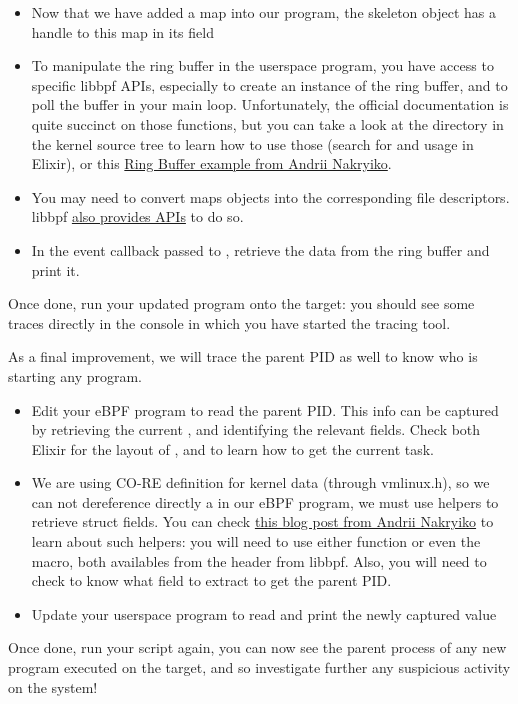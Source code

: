 \begin{itemize}
  \begin{itemize}
    \item Now that we have added a map into our program, the skeleton object has a handle to this map in its  field
    \item To manipulate the ring buffer in the userspace program, you have
    access to specific libbpf APIs, especially  to
    create an instance of the ring buffer, and  to poll
    the buffer in your main loop. Unfortunately, the official documentation is
    quite succinct on those functions, but you can take a look at the
     directory in the kernel source tree to learn how to
    use those (search for  and
     usage in Elixir), or this
    \href{https://github.com/anakryiko/bpf-ringbuf-examples/blob/main/src/ringbuf-output.c}{Ring
    Buffer example from Andrii Nakryiko}.
    \item You may need to convert maps objects into the corresponding file descriptors. libbpf \href{https://libbpf.readthedocs.io/en/latest/api.html}{also provides APIs} to do so.
    \item In the event callback passed to , retrieve the data from the ring buffer and print it.
  \end{itemize}
\end{itemize}

Once done, run your updated program onto the target: you should see some traces directly in the console in which you have started the tracing tool.

As a final improvement, we will trace the parent PID as well to know who is starting any program.
\begin{itemize}
  \item Edit your eBPF program to read the parent PID. This info can be captured by retrieving the current , and identifying the relevant fields. Check both Elixir for the layout of , and  to learn how to get the current task.
  \item We are using CO-RE definition for kernel data (through vmlinux.h), so
  we can not dereference directly a  in our eBPF
  program, we must use helpers to retrieve struct fields. You can check
  \href{https://nakryiko.com/posts/bpf-core-reference-guide/#the-missing-manual}{this
  blog post from Andrii Nakryiko} to learn about such helpers: you will need to
  use either  function or even the 
  macro, both availables from the  header from
  libbpf. Also, you will  need to check  to know what
  field to extract to get the parent PID.
  \item Update your userspace program to read and print the newly captured value
\end{itemize}

Once done, run your script again, you can now see the parent process of any new
program executed on the target, and so investigate further any suspicious
activity on the system!
